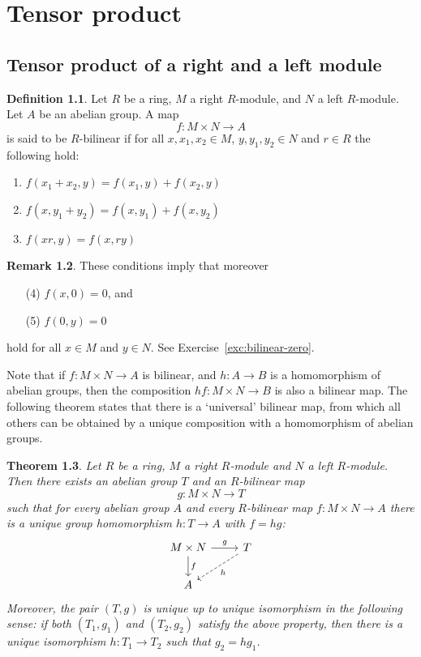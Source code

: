 \documentclass[11pt]{amsbook}
\theoremstyle{plain}
\newtheorem{theorem}{Theorem}
\theoremstyle{definition}
\newtheorem{definition}[theorem]{Definition}
\newtheorem{remark}[theorem]{Remark}
\begin{document}



\chapter{Tensor product}


\section{Tensor product of a right and a left module}

\begin{definition}
Let $R$ be a  ring, $M$ a right $R$-module, and $N$ a left $R$-module. Let $A$ be an abelian group. A map
\[
	f\colon M\times N \to A
\]
is said to be $R$-bilinear if for all $x, x_1,x_2\in M$, $y, y_1,y_2\in N$ and $r\in R$ the following hold:
\begin{enumerate}
\item $f(x_1+x_2,y)=f(x_1,y) + f(x_2,y)$
\item $f(x,y_1+y_2) = f(x,y_1) + f(x,y_2)$
\item $f(xr,y)=f(x,ry)$ 
\end{enumerate}
\end{definition}

\begin{remark}
These conditions imply that moreover
\begin{enumerate}
\item [(4)] $f(x,0)=0$, and
\item[(5)] $f(0,y) =0$
\end{enumerate}
hold for all $x\in M$ and $y\in N$. See Exercise~\ref{exc:bilinear-zero}.
\end{remark}


Note that if $f\colon M\times N\to A$ is bilinear, and $h\colon A\to B$ is a homomorphism of abelian groups, then the composition $hf\colon M\times N \to B$ is also a bilinear map. The following theorem states that there is a `universal' bilinear map, from which all others can be obtained by a unique composition with a homomorphism of abelian groups.

\begin{theorem}\label{thm:existence-of-tensor-product}
Let $R$ be a ring, $M$ a right $R$-module and $N$ a left $R$-module. Then there exists an abelian group $T$ and an $R$-bilinear map
\[
	g\colon M\times N \to T
\]
such that for every abelian group $A$ and every $R$-bilinear map $f\colon M\times N \to A$ there is a unique group homomorphism
$h\colon T \to A$ with $f=hg$:
\[
\begin{tikzcd}
M\times N\arrow{r}{g} \arrow{d}{f} & T \arrow[dashed]{ld}{h} \\
A
\end{tikzcd}
\]
Moreover, the pair $(T,g)$ is unique up to unique isomorphism in the following sense: if both $(T_1,g_1)$ and $(T_2,g_2)$ satisfy the above property, then there is a unique isomorphism $h\colon T_1 \to T_2$ such that $g_2=hg_1$.
\end{theorem}
\end{document}

